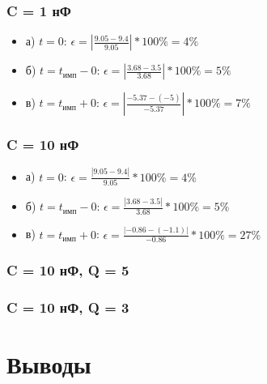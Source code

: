 \subsubsection{C = 1 нФ}
\begin{itemize}
\item[] а) $t = 0$: $\epsilon = |\frac{9.05 - 9.4}{ 9.05 }| * 100\% = 4 \%$

\item[] б) $t = t_\text{имп} - 0$: $\epsilon = |\frac{3.68 - 3.5}{ 3.68 }| * 100\% = 5 \%$

\item[] в) $t = t_\text{имп} + 0$: $\epsilon = |\frac{-5.37 - (-5)}{ -5.37 }| * 100\% = 7 \%$
\end{itemize}

\subsubsection{C = 10 нФ}
\begin{itemize}
\item[] а) $t = 0$: $\epsilon = \frac{| 9.05 - 9.4 |}{ 9.05 } * 100\% = 4 \%$

\item[] б) $t = t_\text{имп} - 0$: $\epsilon = \frac{| 3.68 - 3.5 |}{ 3.68 } * 100\% = 5 \%$

\item[] в) $t = t_\text{имп} + 0$: $\epsilon = \frac{| -0.86 - (-1.1) |}{ -0.86 } * 100\% = 27 \%$
\end{itemize}

\subsubsection{C = 10 нФ, Q = 5}

\subsubsection{C = 10 нФ, Q = 3}
  
\section{Выводы}



